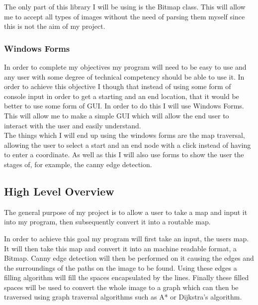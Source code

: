 \begin{FlushLeft}
    The only part of this library I will be using is the Bitmap class. This will allow me to accept all types of images without the need of parsing them myself since this is not the aim of my project. 
    \\ \bk

    \subsubsection{Windows Forms}
    In order to complete my objectives my program will need to be easy to use and any user with some degree of technical competency should be able to use it. In order to achieve this objective I though that instead of using some form of console input in order to get a starting and an end location, that it would be better to use some form of GUI. In order to do this I will use Windows Forms. This will allow me to make a simple GUI which will allow the end user to interact with the user and easily understand. \\ 

    The things which I will end up using the windows forms are the map traversal, allowing the user to select a start and an end node with a click instead of having to enter a coordinate. As well as this I will also use forms to show the user the stages of, for example, the canny edge detection.
    \\ \bk

    \subsection{High Level Overview}
    The general purpose of my project is to allow a user to take a map and input it into my program, then subsequently convert it into a routable map. \\ \bk
    
    In order to achieve this goal my program will first take an input, the users map. It will then take this map and convert it into an machine readable format, a Bitmap. Canny edge detection will then be performed on it causing the edges and the surroundings of the paths on the image to be found. Using these edges a filling algorithm will fill the spaces encapsulated by the lines. Finally these filled spaces will be used to convert the whole image to a graph which can then be traversed using graph traversal algorithms such as A* or Dijkstra's algorithm. \\ \bk


\end{FlushLeft}
